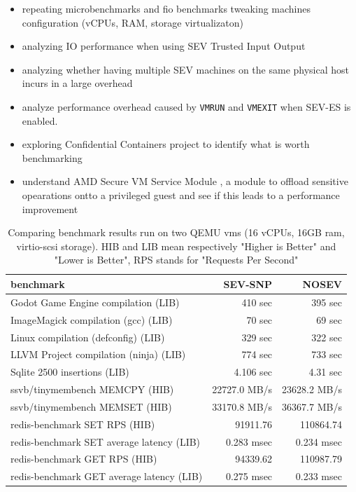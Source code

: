 \documentclass[twocolumn]{article}
\begin{document}
\begin{itemize}
    \item repeating microbenchmarks and fio benchmarks tweaking machines configuration (vCPUs, RAM, storage virtualizaton)
    \item analyzing IO performance when using SEV Trusted Input Output \cite{tio}
    \item analyzing whether having multiple SEV machines on the same physical host incurs in a large overhead
    \item analyze performance overhead caused by \texttt{VMRUN} and \texttt{VMEXIT} when SEV-ES is enabled.
    \item exploring Confidential Containers \cite{coco} project to identify what is worth benchmarking
    \item understand AMD Secure VM Service Module \cite{svsm}, a module to offload sensitive opearations ontto a privileged guest and see if this leads to a performance improvement
\end{itemize}
\begin{table}
    \centering
    \label{tab:tinyben-results}
    \begin{tabular}{l|r|r}
    \textbf{benchmark}                        & \textbf{SEV-SNP} & \textbf{NOSEV} \\
    \hline
    Godot Game Engine compilation (LIB)       &  410 sec         & 395 sec        \\
    ImageMagick compilation (gcc) (LIB)       &  70 sec          & 69 sec         \\
    Linux compilation (defconfig) (LIB)       &  329 sec         & 322 sec        \\
    LLVM Project compilation (ninja) (LIB)    &  774 sec         & 733 sec        \\
    Sqlite 2500 insertions (LIB)              &  4.106 sec       & 4.31 sec       \\
    ssvb/tinymembench MEMCPY (HIB)            &  22727.0 MB/s    & 23628.2 MB/s   \\
    ssvb/tinymembench MEMSET (HIB)            &  33170.8 MB/s    & 36367.7 MB/s   \\
    redis-benchmark SET RPS (HIB)             &  91911.76        & 110864.74      \\
    redis-benchmark SET average latency (LIB) &  0.283 msec      & 0.234 msec     \\
    redis-benchmark GET RPS (HIB)             &  94339.62        & 110987.79      \\
    redis-benchmark GET average latency (LIB) &  0.275 msec	     & 0.233 msec     \\
    \end{tabular}
    \caption{Comparing benchmark results run on two QEMU vms (16 vCPUs, 16GB ram, virtio-scsi storage). HIB and LIB mean respectively "Higher is Better" and "Lower is Better", RPS stands for "Requests Per Second"} 
\end{table}
\printbibliography
\end{document}
